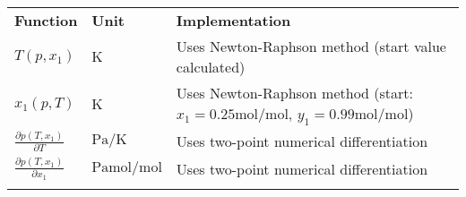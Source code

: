 \begin{longtable}[l]{l|l|p{7.5cm}}
	\toprule
	\addlinespace
	\textbf{Function} & \textbf{Unit} &	\textbf{Implementation} \\
	\addlinespace
	\midrule
	\endhead
	
	\bottomrule
	\endfoot
	\bottomrule
	\endlastfoot
	\addlinespace
	
	$T(p,x_1)$	& $\si{\kelvin}$ & Uses Newton-Raphson method (start value calculated) \\
	$x_1(p,T)$	& $\si{\kelvin}$ & Uses Newton-Raphson method (start: $x_1 = 0.25 \si{\mole\per\mole}$, $y_1 = 0.99 \si{\mole\per\mole}$) \\
	$\frac{\partial p(T,x_1)}{\partial T}$	& $\si{\pascal\per\kelvin}$ & Uses two-point numerical differentiation\\
	$\frac{\partial p(T,x_1)}{\partial x_1}$	& $\si{\pascal\mole\per\mole}$ & Uses two-point numerical differentiation\\
	
	\addlinespace
\end{longtable}
%
